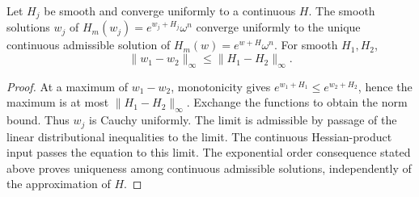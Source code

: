 \begin{proposition}\label{draft:604-proper-uniform-stability}
Let $H_j$ be smooth and converge uniformly to a continuous $H$.
The smooth solutions $w_j$ of
$H_m(w_j)=e^{w_j+H_j}\omega^n$ converge uniformly to the unique
continuous admissible solution of
$H_m(w)=e^{w+H}\omega^n$. For smooth $H_1,H_2$,
\[
 \|w_1-w_2\|_\infty\leq\|H_1-H_2\|_\infty.
\]
\end{proposition}
\begin{proof}
At a maximum of $w_1-w_2$, monotonicity gives
$e^{w_1+H_1}\leq e^{w_2+H_2}$, hence the maximum is at most
$\|H_1-H_2\|_\infty$. Exchange the functions to obtain the norm bound.
Thus $w_j$ is Cauchy uniformly. The limit is admissible by passage of
the linear distributional inequalities to the limit. The continuous
Hessian-product input passes the equation to this limit. The exponential
order consequence stated above proves uniqueness among continuous
admissible solutions, independently of the approximation of $H$.
\end{proof}

